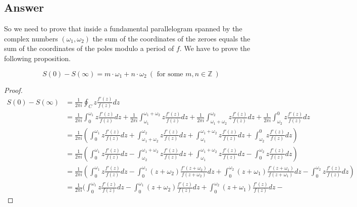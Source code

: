 \subsection*{Answer}
\noindent
So we need to prove that inside a fundamental parallelogram spanned by the complex numbers $(\omega_1, \omega_2)$ the
sum of the coordinates of the zeroes equals the sum of the coordinates of the poles modulo a period of $f$. We have to
prove the following proposition.

\begin{proposition}
    \[
        S(0) - S(\infty) = m \cdot \omega_1 + n \cdot \omega_2  \  ( \text{ for some } m,n \in \mathbb{Z} \  )
    \]
\end{proposition}

\begin{proof}
    \begin{align*}
        S(0) - S(\infty) &= \frac{1}{2 \pi i} \oint_{C} z \frac{f'(z)}{f(z)} dz \\
        &= \frac{1}{2 \pi i} \int_{0}^{\omega_1} z \frac{f'(z)}{f(z)} dz +
                            \frac{1}{2 \pi i} \int_{\omega_1}^{\omega_1 + \omega_2} z \frac{f'(z)}{f(z)} dz +
                            \frac{1}{2 \pi i} \int_{\omega_1 + \omega_2}^{\omega_2} z \frac{f'(z)}{f(z)} dz +
                            \frac{1}{2 \pi i} \int_{\omega_2}^{0} z \frac{f'(z)}{f(z)} dz \\
        &= \frac{1}{2 \pi i} ( \int_{0}^{\omega_1} z \frac{f'(z)}{f(z)} dz +
         \int_{\omega_1 + \omega_2}^{\omega_2} z \frac{f'(z)}{f(z)} dz +
         \int_{\omega_1}^{\omega_1 + \omega_2} z \frac{f'(z)}{f(z)} dz +
         \int_{\omega_2}^{0} z \frac{f'(z)}{f(z)} dz ) \\
        &= \frac{1}{2 \pi i} ( \int_{0}^{\omega_1} z \frac{f'(z)}{f(z)} dz -
        \int_{\omega_2}^{\omega_1 + \omega_2} z \frac{f'(z)}{f(z)} dz +
        \int_{\omega_1}^{\omega_1 + \omega_2} z \frac{f'(z)}{f(z)} dz -
        \int_{0}^{\omega_2} z \frac{f'(z)}{f(z)} dz ) \\
        &= \frac{1}{2 \pi i} ( \int_{0}^{\omega_1} z \frac{f'(z)}{f(z)} dz -
        \int_{0}^{\omega_1} (z + \omega_2) \frac{f'(z+\omega_2)}{f(z+\omega_2)} dz +
        \int_{0}^{\omega_2} (z + \omega_1) \frac{f'(z+\omega_1)}{f(z+\omega_1)} dz -
        \int_{0}^{\omega_2} z \frac{f'(z)}{f(z)} dz ) \\
        &= \frac{1}{2 \pi i} ( \int_{0}^{\omega_1} z \frac{f'(z)}{f(z)} dz -
        \int_{0}^{\omega_1} (z + \omega_2) \frac{f'(z)}{f(z)} dz +
        \int_{0}^{\omega_2} (z + \omega_1) \frac{f'(z)}{f(z)} dz -

\end{align*}
\end{proof}

